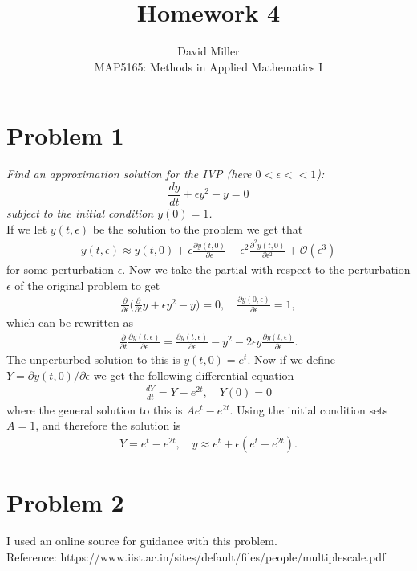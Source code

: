 \documentclass[12pt]{article}
\theoremstyle{remark}
\begin{document}
 
\title{Homework 4}
\author{David Miller \\ 
MAP5165: Methods in Applied Mathematics I} 
 
\maketitle

\section*{Problem 1}
\textit{Find an approximation solution for the IVP (here $0 < \epsilon << 1$):}
$$ \frac{dy}{dt} + \epsilon y^2 - y = 0 $$
\textit{subject to the initial condition $y(0) = 1$.} \\ 

If we let $y(t,\epsilon)$ be the solution to the problem we get that 
\begin{align*}
	y(t, \epsilon) \approx y(t,0) + \epsilon\frac{\partial y(t,0)}{\partial\epsilon} + \epsilon^2\frac{\partial^2 y(t,0)}{\partial\epsilon^2} + \mathcal{O}(\epsilon^3)
\end{align*}
for some perturbation $\epsilon$. Now we take the partial with respect to the perturbation $\epsilon$ of the original problem to get
\begin{align*}
	\frac{\partial}{\partial\epsilon}\bigg(\frac{\partial}{\partial t}y + \epsilon y^2 - y\bigg) = 0, \quad \frac{\partial y(0, \epsilon)}{\partial \epsilon} = 1,
\end{align*}
which can be rewritten as 
\begin{align*}
	\frac{\partial}{\partial t}\frac{\partial y(t, \epsilon)}{\partial\epsilon} = \frac{\partial y(t, \epsilon)}{\partial\epsilon} - y^2 - 2\epsilon y\frac{\partial y(t,\epsilon)}{\partial\epsilon}.
\end{align*}
The unperturbed solution to this is $y(t,0) = e^t$. Now if we define $Y = \partial y(t,0)/\partial\epsilon$ we get the following differential equation
\begin{align*}
	\frac{dY}{dt} = Y - e^{2t}, \quad Y(0) = 0
\end{align*}
where the general solution to this is $Ae^t - e^{2t}$. Using the initial condition sets $A = 1$, and therefore the solution is 
\begin{align*}
	Y = e^t - e^{2t}, \quad y \approx e^t + \epsilon(e^t - e^{2t}). 	
\end{align*}

\newpage

\section*{Problem 2}
I used an online source for guidance with this problem. \\
Reference: https://www.iist.ac.in/sites/default/files/people/multiplescale.pdf \\
\end{document}
